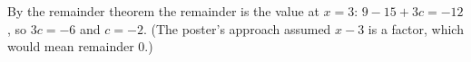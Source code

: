 By the remainder theorem the remainder is the value at $x=3$: $9-15+3c=-12$, so $3c=-6$ and $c=\boxed{-2}$. (The poster's approach assumed $x-3$ is a factor, which would mean remainder $0$.)
